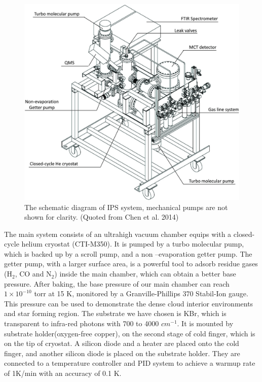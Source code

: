 \begin{figure}
\centering
\includegraphics[width=\textwidth]{figures/chapter2/system.jpg}
\caption{The schematic diagram of IPS system, mechanical pumps are not shown for clarity. (Quoted from Chen et al. 2014)}
\label{fig:system}
\end{figure}

The main system consists of an ultrahigh vacuum chamber equips with a closed-cycle helium cryostat (CTI-M350). It is pumped by a turbo molecular pump, which is backed up by a scroll pump, and a non –evaporation getter pump. The getter pump, with a larger surface area, is a powerful tool to adsorb residue gases (H$_2$, CO and N$_2$) inside the main chamber, which can obtain a better base pressure. After baking, the base pressure of our main chamber can reach $1 \times 10^{-10}$ torr at 15 K, monitored by a Granville-Phillips 370 Stabil-Ion gauge. This pressure can be used to demonstrate the dense cloud interior environments and star forming region. The substrate we have chosen is KBr, which is transparent to infra-red photons with 700 to 4000 $cm^{-1}$. It is mounted by substrate holder(oxygen-free copper), on the second stage of cold finger, which is on the tip of cryostat. A silicon diode and a heater are placed onto the cold finger, and another silicon diode is placed on the substrate holder. They are connected to a temperature controller and PID system to achieve a warmup rate of 1K/min with an accuracy of 0.1 K.

